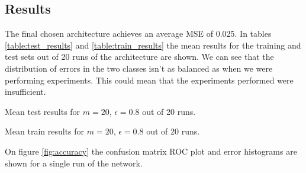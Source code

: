 \documentclass[a4paper, 11pt]{article}
\begin{document}
\subsection{Results}
The final chosen architecture achieves an average MSE of 0.025. In tables \ref{table:test_results} and \ref{table:train_results} the mean results for the training and test sets out of 20 runs of the architecture are shown. We can see that the distribution of errors in the two classes isn't as balanced as when we were performing experiments. This could mean that the experiments performed were insufficient. 
\begin{table}[h!]
\caption{Mean test results for $m=20$, $\epsilon=0.8$ out of 20 runs.}
\label{table:test_results}
\end{table}

\begin{table}[h!]
\caption{Mean train results for $m=20$, $\epsilon=0.8$ out of 20 runs.}
\label{table:train_results}
\end{table}


On figure \ref{fig:accuracy} the confusion matrix ROC plot and error histograms are shown for a single run of the network.
\end{document}
